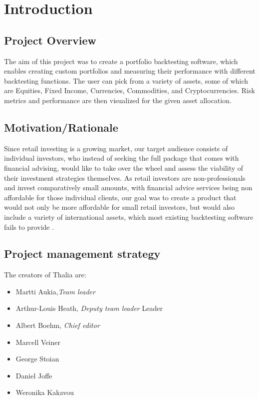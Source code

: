 \documentclass[main.tex]{subfiles}
\begin{document}
\section{Introduction}
\subsection {Project Overview}

The aim of this project was to create a portfolio backtesting software, which enables creating custom portfolios and measuring their performance with different backtesting functions. The user can pick from a variety of assets, some of which are Equities, Fixed Income, Currencies, Commodities, and Cryptocurrencies. Risk metrics and performance are then visualized for the given asset allocation.
\subsection{Motivation/Rationale}
Since retail investing is a growing market, our target audience consists of individual investors, who instead of seeking the full package that comes with financial advising, would like to take over the wheel and assess the viability of their investment strategies themselves. As retail investors are non-professionals and invest comparatively small amounts, with financial advice services being non affordable for those individual clients, our goal was to create a product that would not only be more affordable for small retail investors, but would also include a variety of international assets, which most existing backtesting software fails to provide \cite{WP_IBC}.

\subsection{Project management strategy}

The creators of Thalia are:
\begin{itemize}
    \item Martti Aukia,\textit{Team leader}
    \item Arthur-Louis Heath, \textit{Deputy team leader} Leader
	\item Albert Boehm, \textit{Chief editor}
	\item Marcell Veiner
	\item George Stoian 
	\item Daniel Joffe
	\item Weronika Kakavou
\end{itemize}
\end{document}
